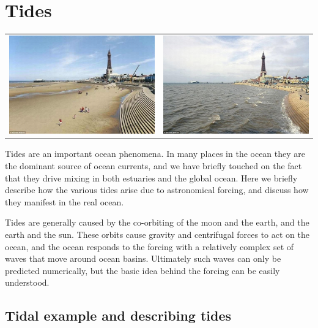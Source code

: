 
\chapter{Tides}

\label{ch:tides}
\begin{tabular}{ll}
    \includegraphics[width=3.2in]{figs/Waves/LowTide.jpg} & \includegraphics[width=3.2in]{figs/Waves/HighTide.jpg}
\end{tabular}

Tides are an important ocean phenomena. In many places in the ocean they are the dominant source of ocean currents, and we have briefly touched on the fact that they drive mixing in both estuaries and the global ocean.  Here we briefly describe how the various tides arise due to astronomical forcing, and discuss how they manifest in the real ocean.  

Tides are generally caused by the co-orbiting of the moon and the earth, and the earth and the sun.  These orbits cause gravity and centrifugal forces to act on the ocean, and the ocean responds to the forcing with a relatively complex set of waves that move around ocean basins.  Ultimately such waves can only be predicted numerically, but the basic idea behind the forcing can be easily understood.  

\section{Tidal example and describing tides}

